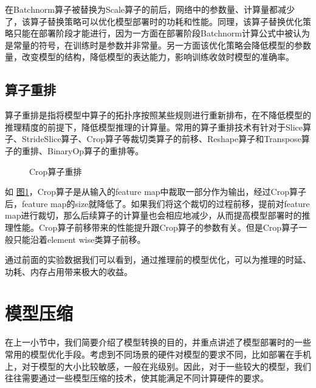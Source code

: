 \documentclass[letterpaper,10pt,english]{sphinxmanual}
\let\sphinxpxdimen\pdfpxdimen\else\newdimen\sphinxpxdimen
\begin{document}
\sphinxAtStartPar
在Batchnorm算子被替换为Scale算子的前后，网络中的参数量、计算量都减少了，该算子替换策略可以优化模型部署时的功耗和性能。同理，该算子替换优化策略只能在部署阶段才能进行，因为一方面在部署阶段Batchnorm计算公式中被认为是常量的符号，在训练时是参数并非常量。另一方面该优化策略会降低模型的参数量，改变模型的结构，降低模型的表达能力，影响训练收敛时模型的准确率。


\subsection{算子重排}
\label{\detokenize{chapter_model_deployment/model_converter_and_optimizer:id5}}
\sphinxAtStartPar
算子重排是指将模型中算子的拓扑序按照某些规则进行重新排布，在不降低模型的推理精度的前提下，降低模型推理的计算量。常用的算子重排技术有针对于Slice算子、StrideSlice算子、Crop算子等裁切类算子的前移、Reshape算子和Transpose算子的重排、BinaryOp算子的重排等。

\begin{figure}[H]
\centering
\capstart

\noindent\sphinxincludegraphics[width=500\sphinxpxdimen]{{crop-reorder}.png}
\caption{Crop算子重排}\label{\detokenize{chapter_model_deployment/model_converter_and_optimizer:id10}}\label{\detokenize{chapter_model_deployment/model_converter_and_optimizer:ch08-fig-crop-reorder}}\end{figure}

\sphinxAtStartPar
如 \hyperref[\detokenize{chapter_model_deployment/model_converter_and_optimizer:ch08-fig-crop-reorder}]{图\ref{\detokenize{chapter_model_deployment/model_converter_and_optimizer:ch08-fig-crop-reorder}}}，Crop算子是从输入的feature
map中裁取一部分作为输出，经过Crop算子后，feature
map的size就降低了。如果我们将这个裁切的过程前移，提前对feature
map进行裁切，那么后续算子的计算量也会相应地减少，从而提高模型部署时的推理性能。Crop算子前移带来的性能提升跟Crop算子的参数有关。但是Crop算子一般只能沿着element
wise类算子前移。

\sphinxAtStartPar
通过前面的实验数据我们可以看到，通过推理前的模型优化，可以为推理的时延、功耗、内存占用带来极大的收益。


\section{模型压缩}
\label{\detokenize{chapter_model_deployment/model_compression:ch08-sec-model-compression}}\label{\detokenize{chapter_model_deployment/model_compression:id1}}\label{\detokenize{chapter_model_deployment/model_compression::doc}}
\sphinxAtStartPar
在上一小节中，我们简要介绍了模型转换的目的，并重点讲述了模型部署时的一些常用的模型优化手段。考虑到不同场景的硬件对模型的要求不同，比如部署在手机上，对于模型的大小比较敏感，一般在兆级别。因此，对于一些较大的模型，我们往往需要通过一些模型压缩的技术，使其能满足不同计算硬件的要求。
\end{document}
